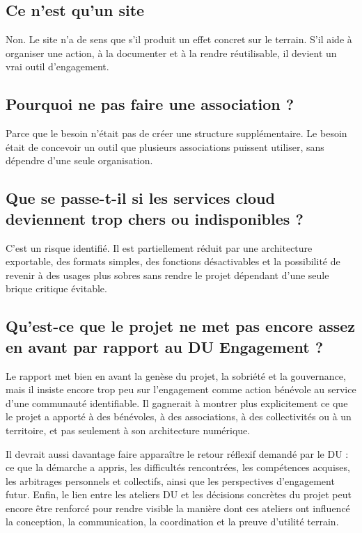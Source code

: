 \documentclass[
  10pt,
  a4paper,
  DIV=11,
  numbers=noendperiod,
  oneside]{scrreprt}
\begin{document}
\subsection{Ce n'est qu'un site}\label{ce-nest-quun-site}

Non. Le site n'a de sens que s'il produit un effet concret sur le
terrain. S'il aide à organiser une action, à la documenter et à la
rendre réutilisable, il devient un vrai outil d'engagement.

\subsection{Pourquoi ne pas faire une association
?}\label{pourquoi-ne-pas-faire-une-association}

Parce que le besoin n'était pas de créer une structure supplémentaire.
Le besoin était de concevoir un outil que plusieurs associations
puissent utiliser, sans dépendre d'une seule organisation.

\subsection{Que se passe-t-il si les services cloud deviennent trop
chers ou indisponibles
?}\label{que-se-passe-t-il-si-les-services-cloud-deviennent-trop-chers-ou-indisponibles}

C'est un risque identifié. Il est partiellement réduit par une
architecture exportable, des formats simples, des fonctions
désactivables et la possibilité de revenir à des usages plus sobres sans
rendre le projet dépendant d'une seule brique critique évitable.

\subsection{Qu'est-ce que le projet ne met pas encore assez en avant par
rapport au DU Engagement
?}\label{quest-ce-que-le-projet-ne-met-pas-encore-assez-en-avant-par-rapport-au-du-engagement}

Le rapport met bien en avant la genèse du projet, la sobriété et la
gouvernance, mais il insiste encore trop peu sur l'engagement comme
action bénévole au service d'une communauté identifiable. Il gagnerait à
montrer plus explicitement ce que le projet a apporté à des bénévoles, à
des associations, à des collectivités ou à un territoire, et pas
seulement à son architecture numérique.

Il devrait aussi davantage faire apparaître le retour réflexif demandé
par le DU : ce que la démarche a appris, les difficultés rencontrées,
les compétences acquises, les arbitrages personnels et collectifs, ainsi
que les perspectives d'engagement futur. Enfin, le lien entre les
ateliers DU et les décisions concrètes du projet peut encore être
renforcé pour rendre visible la manière dont ces ateliers ont influencé
la conception, la communication, la coordination et la preuve d'utilité
terrain.
\end{document}
